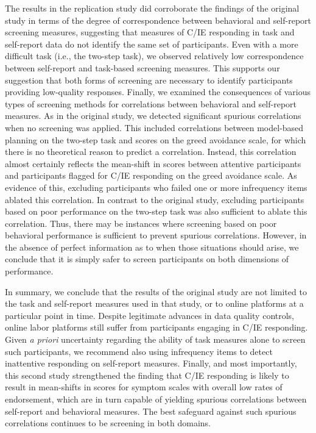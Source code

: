 \documentclass[a4paper,notitlepage,12pt]{article}
\begin{document}
The results in the replication study did corroborate the findings of the original study in terms of the degree of correspondence between behavioral and self-report screening measures, suggesting that measures of C/IE responding in task and self-report data do not identify the same set of participants. Even with a more difficult task (i.e., the two-step task), we observed relatively low correspondence between self-report and task-based screening measures. This supports our suggestion that both forms of screening are necessary to identify participants providing low-quality responses. Finally, we examined the consequences of various types of screening methods for correlations between behavioral and self-report measures. As in the original study, we detected significant spurious correlations when no screening was applied. This included correlations between model-based planning on the two-step task and scores on the greed avoidance scale, for which there is no theoretical reason to predict a correlation. Instead, this correlation almost certainly reflects the mean-shift in scores between attentive participants and participants flagged for C/IE responding on the greed avoidance scale. As evidence of this, excluding participants who failed one or more infrequency items ablated this correlation. In contrast to the original study, excluding participants based on poor performance on the two-step task was also sufficient to ablate this correlation. Thus, there may be instances where screening based on poor behavioral performance is sufficient to prevent spurious correlations. However, in the absence of perfect information as to when those situations should arise, we conclude that it is simply safer to screen participants on both dimensions of performance. 

In summary, we conclude that the results of the original study are not limited to the task and self-report measures used in that study, or to online platforms at a particular point in time. Despite legitimate advances in data quality controls, online labor platforms still suffer from participants engaging in C/IE responding. Given \textit{a priori} uncertainty regarding the ability of task measures alone to screen such participants, we recommend also using infrequency items to detect inattentive responding on self-report measures. Finally, and most importantly, this second study strengthened the finding that C/IE responding is likely to result in mean-shifts in scores for symptom scales with overall low rates of endorsement, which are in turn capable of yielding spurious correlations between self-report and behavioral measures. The best safeguard against such spurious correlations continues to be screening in both domains. 
\end{document}

